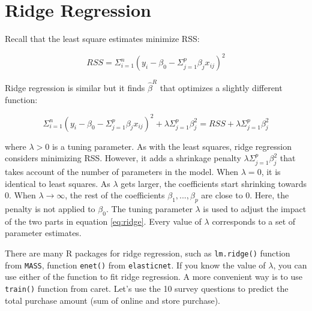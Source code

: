 \documentclass[
  12pt,
]{krantz}
\makeatletter
\newenvironment{Shaded}{\begin{snugshade}}{\end{snugshade}}
\newcommand{\CommentTok}[1]{\textcolor[rgb]{0.37,0.37,0.37}{\textit{#1}}}
\newcommand{\DecValTok}[1]{\textcolor[rgb]{0.06,0.06,0.06}{#1}}
\newcommand{\FunctionTok}[1]{\textcolor[rgb]{0,0,0}{#1}}
\newcommand{\NormalTok}[1]{#1}
\newcommand{\OtherTok}[1]{\textcolor[rgb]{0.37,0.37,0.37}{#1}}
\newcommand{\SpecialCharTok}[1]{\textcolor[rgb]{0,0,0}{#1}}
\newcommand{\StringTok}[1]{\textcolor[rgb]{0.5,0.5,0.5}{#1}}
\newenvironment{kframe}{%
\medskip{}
\setlength{\fboxsep}{.8em}
 \def\at@end@of@kframe{}%
 \ifinner\ifhmode%
  \def\at@end@of@kframe{\end{minipage}}%
  \begin{minipage}{\columnwidth}%
 \fi\fi%
 \def\FrameCommand##1{\hskip\@totalleftmargin \hskip-\fboxsep
 \colorbox{shadecolor}{##1}\hskip-\fboxsep
     \hskip-\linewidth \hskip-\@totalleftmargin \hskip\columnwidth}%
 \MakeFramed {\advance\hsize-\width
   \@totalleftmargin\z@ \linewidth\hsize
   \@setminipage}}%
 {\par\unskip\endMakeFramed%
 \at@end@of@kframe}
\renewenvironment{Shaded}{\begin{kframe}}{\end{kframe}}
\makeatother
\begin{document}
\hypertarget{ridge-regression}{%
\section{Ridge Regression}\label{ridge-regression}}

Recall that the least square estimates minimize RSS:

\[RSS=\Sigma_{i=1}^{n}(y_{i}-\beta_{0}-\Sigma_{j=1}^{p}\beta_{j}x_{ij})^{2}\]

Ridge regression \citep{Hoerl1970} is similar but it finds \(\hat{\beta}^{R}\) that optimizes a slightly different function:

\begin{equation}
\Sigma_{i=1}^{n}(y_{i}-\beta_{0}-\Sigma_{j=1}^{p}\beta_{j}x_{ij})^{2}+\lambda\Sigma_{j=1}^{p}\beta_{j}^{2}=RSS+\lambda\Sigma_{j=1}^{p}\beta_{j}^{2}
\label{eq:ridge}
\end{equation}

where \(\lambda >0\) is a tuning parameter. As with the least squares, ridge regression considers minimizing RSS. However, it adds a shrinkage penalty \(\lambda\Sigma_{j=1}^{p}\beta_{j}^{2}\) that takes account of the number of parameters in the model. When \(\lambda = 0\), it is identical to least squares. As \(\lambda\) gets larger, the coefficients start shrinking towards 0. When \(\lambda\rightarrow\infty\), the rest of the coefficients \(\beta_{1},...,\beta_{p}\) are close to 0. Here, the penalty is not applied to \(\beta_{0}\). The tuning parameter \(\lambda\) is used to adjust the impact of the two parts in equation \eqref{eq:ridge}. Every value of \(\lambda\) corresponds to a set of parameter estimates.

There are many R packages for ridge regression, such as \texttt{lm.ridge()} function from \texttt{MASS}, function \texttt{enet()} from \texttt{elasticnet}. If you know the value of \(\lambda\), you can use either of the function to fit ridge regression. A more convenient way is to use \texttt{train()} function from caret. Let's use the 10 survey questions to predict the total purchase amount (sum of online and store purchase).

\begin{Shaded}
\end{Shaded}
\end{document}

